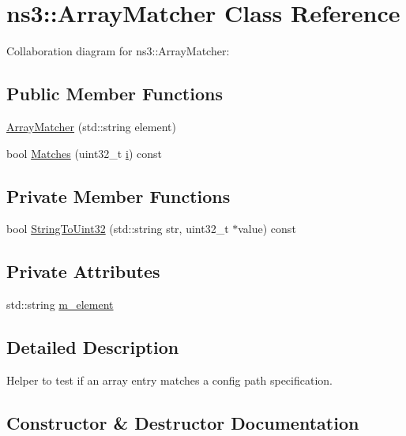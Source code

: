 \hypertarget{classns3_1_1ArrayMatcher}{}\section{ns3\+:\+:Array\+Matcher Class Reference}
\label{classns3_1_1ArrayMatcher}


Collaboration diagram for ns3\+:\+:Array\+Matcher\+:
\subsection*{Public Member Functions}
\begin{DoxyCompactItemize}
\item 
\hyperlink{classns3_1_1ArrayMatcher_af739906ed10dd878d793ece4ac8a16f4}{Array\+Matcher} (std\+::string element)
\item 
bool \hyperlink{classns3_1_1ArrayMatcher_a844f379ae141a473fd28829995e97507}{Matches} (uint32\+\_\+t \hyperlink{lte__uplink__power__control_8m_a6f6ccfcf58b31cb6412107d9d5281426}{i}) const 
\end{DoxyCompactItemize}
\subsection*{Private Member Functions}
\begin{DoxyCompactItemize}
\item 
bool \hyperlink{classns3_1_1ArrayMatcher_aa6d9360027fc1c10911e8ce81c18291f}{String\+To\+Uint32} (std\+::string str, uint32\+\_\+t $\ast$value) const 
\end{DoxyCompactItemize}
\subsection*{Private Attributes}
\begin{DoxyCompactItemize}
\item 
std\+::string \hyperlink{classns3_1_1ArrayMatcher_ad9d28e2e5604f925a9281af1927e3749}{m\+\_\+element}
\end{DoxyCompactItemize}


\subsection{Detailed Description}
Helper to test if an array entry matches a config path specification. 

\subsection{Constructor \& Destructor Documentation}
